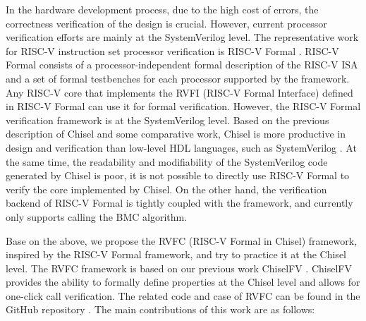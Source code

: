 \documentclass[conference]{IEEEtran}
\theoremstyle{definition}
\begin{document}
In the hardware development process, due to the high cost of errors, the correctness verification of the design is crucial.
However, current processor verification efforts are mainly at the SystemVerilog level.
The representative work for RISC-V instruction set processor verification is RISC-V Formal \cite{riscv-formal}.
RISC-V Formal consists of a processor-independent formal description of the RISC-V ISA and a set of formal testbenches for each processor supported by the framework.
Any RISC-V core that implements the RVFI (RISC-V Formal Interface) defined in RISC-V Formal can use it for formal verification.
However, the RISC-V Formal verification framework is at the SystemVerilog level.
Based on the previous description of Chisel and some comparative work, Chisel is more productive in design and verification than low-level HDL languages, such as SystemVerilog \cite{im2021comparative}.
At the same time, the readability and modifiability of the SystemVerilog code generated by Chisel is poor, it is not possible to directly use RISC-V Formal to verify the core implemented by Chisel.
On the other hand, the verification backend of RISC-V Formal is tightly coupled with the framework, and currently only supports calling the BMC algorithm.

Base on the above, we propose the RVFC (RISC-V Formal in Chisel) framework, inspired by the RISC-V Formal framework, and try to practice it at the Chisel level. 
The RVFC framework is based on our previous work ChiselFV \cite{ChiselFV}.
ChiselFV provides the ability to formally define properties at the Chisel level and allows for one-click call verification.
The related code and case of RVFC can be found in the GitHub repository \cite{riscvFvChisel}.
The main contributions of this work are as follows:
\end{document}
